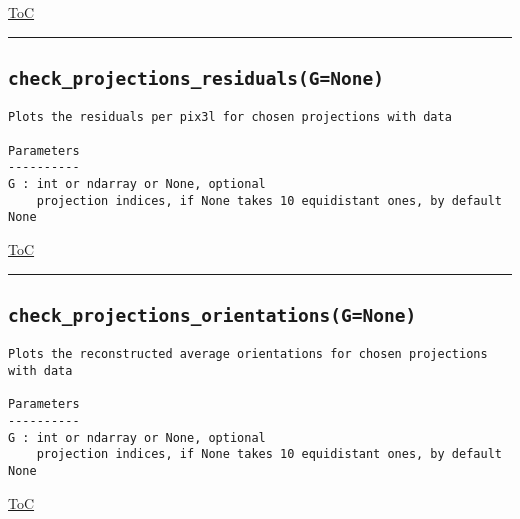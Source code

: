 \documentclass{article}
\begin{document}
\begin{flushright}

\hyperref[toc]{ToC}

\end{flushright}



\vspace{5mm}

\hrule

\subsection*{\texttt{check\_projections\_residuals(G=None)}}

\begin{lstlisting}[language=docstring]
Plots the residuals per pix3l for chosen projections with data

Parameters
----------
G : int or ndarray or None, optional
    projection indices, if None takes 10 equidistant ones, by default None
\end{lstlisting}

\begin{flushright}

\hyperref[toc]{ToC}

\end{flushright}



\vspace{5mm}

\hrule

\subsection*{\texttt{check\_projections\_orientations(G=None)}}

\begin{lstlisting}[language=docstring]
Plots the reconstructed average orientations for chosen projections with data

Parameters
----------
G : int or ndarray or None, optional
    projection indices, if None takes 10 equidistant ones, by default None
\end{lstlisting}

\begin{flushright}

\hyperref[toc]{ToC}

\end{flushright}
\end{document}
